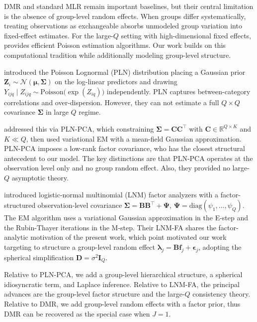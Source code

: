 \documentclass[]{report}
\theoremstyle{definition}
\begin{document}
DMR and standard MLR remain important baselines, but their central limitation is the absence of group-level random effects. When groups differ systematically, treating observations as exchangeable absorbs unmodeled group variation into fixed-effect estimates. For the large-$Q$ setting with high-dimensional fixed effects, \citet{Correia_2020} provides efficient Poisson estimation algorithms. Our work builds on this computational tradition while additionally modeling group-level structure.
 
\citet{Aitchison_1989} introduced the Poisson Lognormal (PLN) distribution placing a Gaussian prior $\bm{Z}_i \sim \mathcal{N}(\bm{\mu}, \bm{\Sigma})$ on the log-linear predictors and drawing $Y_{ijq} \mid Z_{ijq} \sim \mathrm{Poisson}\bigl(\exp(Z_{iq})\bigr)$ independently. PLN captures between-category correlations and over-dispersion. However, they can not  estimate a full $Q\times Q$ covariance $\bm{\Sigma}$ in large $Q$ regime.
 
\citet{chiquet2018variational} addressed this via PLN-PCA, which constraining $\bm{\Sigma} = \mathbf{CC}^\top$ with $\mathbf{C}\in\mathbb{R}^{Q\times K}$ and $K\ll Q$, then used variational EM with a mean-field Gaussian approximation. PLN-PCA imposes a low-rank factor covariance, who has the closest structural antecedent to our model. The key distinctions are that PLN-PCA operates at the observation level only and no group random effect. Also, they provided no large-$Q$ asymptotic theory.
 
\citet{Tu2023} introduced logistic-normal multinomial (LNM) factor analyzers with a factor-structured observation-level covariance $\bm{\Sigma} = \mathbf{BB}^{\top} + \bm{\Psi}$, $\bm{\Psi} = \mathrm{diag}(\psi_1,\ldots,\psi_Q)$. The EM algorithm uses a variational Gaussian approximation in the E-step and the Rubin-Thayer iterations \citep{Rubin1982} in the M-step. Their LNM-FA shares the factor-analytic motivation of the present work, which point motivated our work targeting to structure a group-level random effect $\bm{\lambda}_j = \mathbf{B}\mathbf{f}_j + \bm{\epsilon}_j$, adopting the spherical simplification $\mathbf{D} = \sigma^2\mathbf{I}_Q$. 

Relative to PLN-PCA, we add a group-level hierarchical structure, a spherical idiosyncratic term, and Laplace inference. Relative to LNM-FA, the principal advances are the group-level factor structure and the large-$Q$ consistency theory. Relative to DMR, we add group-level random effects with a factor prior, thus DMR can be recovered as the special case when $J = 1$.
\end{document}

